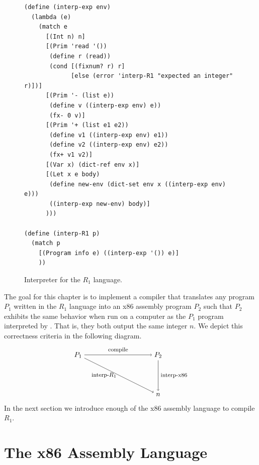 \documentclass[11pt]{book}
\begin{document}
\begin{figure}[tbp]
\begin{lstlisting}
(define (interp-exp env)
  (lambda (e)
    (match e
      [(Int n) n]
      [(Prim 'read '())
       (define r (read))
       (cond [(fixnum? r) r]
             [else (error 'interp-R1 "expected an integer" r)])]
      [(Prim '- (list e))
       (define v ((interp-exp env) e))
       (fx- 0 v)]
      [(Prim '+ (list e1 e2))
       (define v1 ((interp-exp env) e1))
       (define v2 ((interp-exp env) e2))
       (fx+ v1 v2)]
      [(Var x) (dict-ref env x)]
      [(Let x e body)
       (define new-env (dict-set env x ((interp-exp env) e)))
       ((interp-exp new-env) body)]
      )))

(define (interp-R1 p)
  (match p
    [(Program info e) ((interp-exp '()) e)]
    ))
\end{lstlisting}
\caption{Interpreter for the $R_1$ language.}
\label{fig:interp-R1}
\end{figure}

The goal for this chapter is to implement a compiler that translates
any program $P_1$ written in the $R_1$ language into an x86 assembly
program $P_2$ such that $P_2$ exhibits the same behavior when run on a
computer as the $P_1$ program interpreted by .  That
is, they both output the same integer $n$. We depict this correctness
criteria in the following diagram.
\[
\begin{tikzpicture}[baseline=(current  bounding  box.center)]
 \node (p1) at (0,  0)   {$P_1$};
 \node (p2) at (4,  0)   {$P_2$};
 \node (o)  at (4, -2) {$n$};

 \path[->] (p1) edge [above] node {\footnotesize compile} (p2);
 \path[->] (p1) edge [left]  node {\footnotesize interp-$R_1$} (o);
 \path[->] (p2) edge [right] node {\footnotesize interp-x86} (o);
\end{tikzpicture}
\]
In the next section we introduce enough of the x86 assembly
language to compile $R_1$.


\section{The x86 Assembly Language}
\label{sec:x86}
\end{document}

